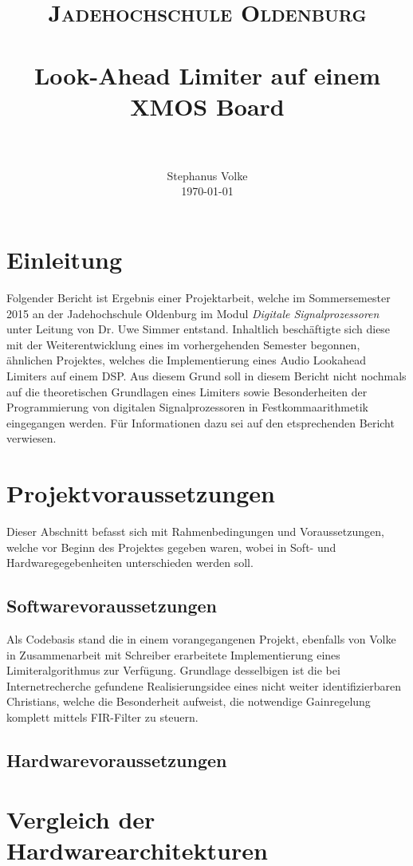 \documentclass[paper=a4, fontsize=12pt]{scrartcl}
\title{
		\usefont{OT1}{bch}{b}{n}
		\normalfont \normalsize \textsc{Jadehochschule Oldenburg} \\ [25pt]
		\horrule{0.5pt} \\[0.4cm]
		\huge Look-Ahead Limiter auf einem XMOS Board \\
		\horrule{2pt} \\[0.5cm]
}
\author{
		\normalfont 								\normalsize
        Stephanus Volke\\[-3pt]		\normalsize
        \today
}
\date{}
\numberwithin{equation}{section}		%
\numberwithin{figure}{section}			%
\numberwithin{table}{section}				%
\begin{document}
\maketitle
\section{Einleitung}
Folgender Bericht ist Ergebnis einer Projektarbeit, welche im Sommersemester 2015 an der Jadehochschule Oldenburg im Modul \textit{Digitale Signalprozessoren} unter Leitung von Dr. Uwe Simmer entstand. Inhaltlich beschäftigte sich diese mit der Weiterentwicklung eines im vorhergehenden Semester begonnen, ähnlichen Projektes, welches die Implementierung eines Audio Lookahead Limiters auf einem DSP. Aus diesem Grund soll in diesem Bericht nicht nochmals auf die theoretischen Grundlagen eines Limiters sowie Besonderheiten der Programmierung von digitalen Signalprozessoren in Festkommaarithmetik eingegangen werden. Für Informationen dazu sei auf den etsprechenden Bericht verwiesen. 


\section{Projektvoraussetzungen}

Dieser Abschnitt befasst sich mit Rahmenbedingungen und Voraussetzungen, welche vor Beginn des Projektes gegeben waren, wobei in Soft- und Hardwaregegebenheiten unterschieden werden soll.

\subsection{Softwarevoraussetzungen}
Als Codebasis stand die in einem vorangegangenen Projekt, ebenfalls von Volke in Zusammenarbeit mit Schreiber erarbeitete Implementierung eines Limiteralgorithmus zur Verfügung. Grundlage desselbigen ist die bei Internetrecherche gefundene Realisierungsidee eines nicht weiter identifizierbaren Christians, welche die Besonderheit aufweist, die notwendige Gainregelung komplett mittels FIR-Filter zu steuern. 


\subsection{Hardwarevoraussetzungen}

\section{Vergleich der Hardwarearchitekturen}
\end{document}
